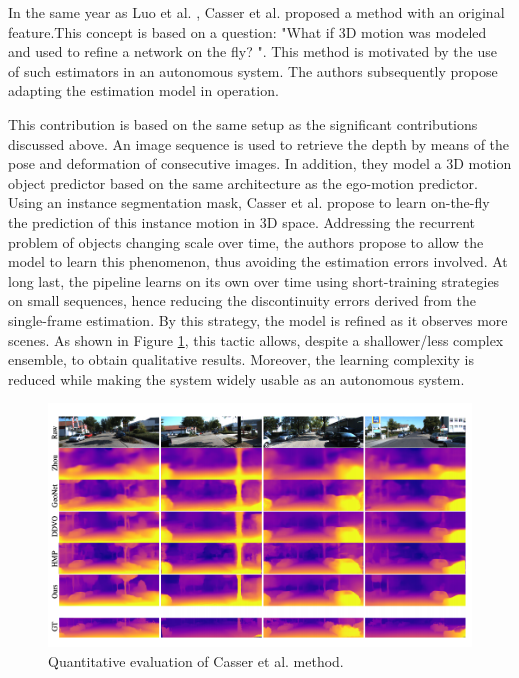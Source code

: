 In the same year as Luo et al. \cite{luo2019every}, Casser et al. \cite{casser2019depth} proposed a method with an original feature.This concept is based on a question: "What if 3D motion was modeled and used to refine a network on the fly? ". This method is motivated by the use of such estimators in an autonomous system. The authors subsequently propose adapting the estimation model in operation.

This contribution is based on the same setup as the significant contributions discussed above. An image sequence is used to retrieve the depth by means of the pose and deformation of consecutive images. In addition, they model a 3D motion object predictor based on the same architecture as the ego-motion predictor. Using an instance segmentation mask, Casser et al. propose to learn on-the-fly the prediction of this instance motion in 3D space. Addressing the recurrent problem of objects changing scale over time, the authors propose to allow the model to learn this phenomenon, thus avoiding the estimation errors involved. At long last, the pipeline learns on its own over time using short-training strategies on small sequences, hence reducing the discontinuity errors derived from the single-frame estimation. By this strategy, the model is refined as it observes more scenes. As shown in Figure \ref{casserillu}, this tactic allows, despite a shallower/less complex ensemble, to obtain qualitative results. Moreover, the learning complexity is reduced while making the system widely usable as an autonomous system. 

\begin{figure}[h]
	\centering
	\includegraphics[width=0.8\linewidth]{Figures/SOA/casserillu}
	\caption[Quantitative evaluation of Casser et al. method.]{Quantitative evaluation of Casser et al. \cite{casser2019depth} method.}
	\label{casserillu}
\end{figure}


